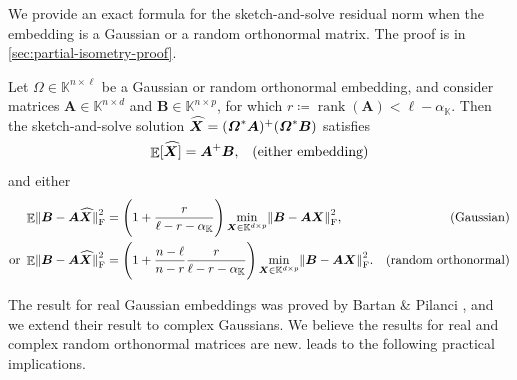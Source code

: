 \documentclass[11pt]{article}
\newcommand{\field}{\mathbb{K}}
\DeclareMathOperator{\rank}{rank}
\newcommand{\mat}[1]{\boldsymbol{#1}}
\newcommand{\norm}[1]{\mleft\| #1 \mright\|}
\DeclareMathOperator{\expect}{\mathbb{E}}
\newcommand{\hatbold}[1]{%
  \skew{4}\widehat{\smash{\boldsymbol{#1}}\mathstrut}}
\newcommand{\Xhat}{\smash{\hatbold{X}}}
\theoremstyle{definition}
\numberwithin{equation}{section}
\begin{document}
We provide an exact formula for the sketch-and-solve residual norm when the embedding is a Gaussian or a random orthonormal matrix.
The proof is in \cref{sec:partial-isometry-proof}.
%
\begin{theorem} \label{thm:partial-isometry}
    Let $\mat{\varOmega} \in \field^{n \times \ell}$ be a Gaussian or random orthonormal embedding, and consider matrices $\mat{A} \in \field^{n\times d}$ and $\mat{B} \in \field^{n\times p}$, for which $r \coloneqq \rank(\mat{A}) < \ell - \alpha_\field$.    
    Then the sketch-and-solve solution $\Xhat = (\mat{\varOmega}^*\mat{A})^+ (\mat{\varOmega}^*\mat{B})$ satisfies 
        \begin{equation*}
        \begin{alignedat}{2}
        \expect[\Xhat] &= \mat{A}^+ \mat{B},& \quad \text{(either embedding)}
        \end{alignedat}
    \end{equation*}
    and either
    \begin{equation*}
        \begin{alignedat}{2}
        \expect \norm{\smash{\mat{B} - \mat{A}\Xhat}}_{\rm F}^2 &= \Biggl(1 + \frac{r}{\ell - r - \alpha_\field}\Biggr) \min_{\mat{X}\in\field^{d\times p}}\norm{\mat{B} - \mat{A}\mat{X}}_{\rm F}^2, & \quad \text{(Gaussian)} \\
        \text{or } \expect \norm{\smash{\mat{B} - \mat{A}\Xhat}}_{\rm F}^2 &= \Biggl(1 + \frac{n-\ell}{n-r} \frac{r}{\ell - r - \alpha_\field}\Biggr) \min_{\mat{X}\in\field^{d\times p}}\norm{\mat{B} - \mat{A}\mat{X}}_{\rm F}^2. & \quad \text{(random orthonormal)}
        \end{alignedat}
    \end{equation*}
\end{theorem}
%
\noindent The result for real Gaussian embeddings was proved by Bartan \& Pilanci \cite[Lem.~2.1]{BP20}, and we extend their result to complex Gaussians.
We believe the results for real and complex random orthonormal matrices are new.
 leads to the following practical implications.
\end{document}
